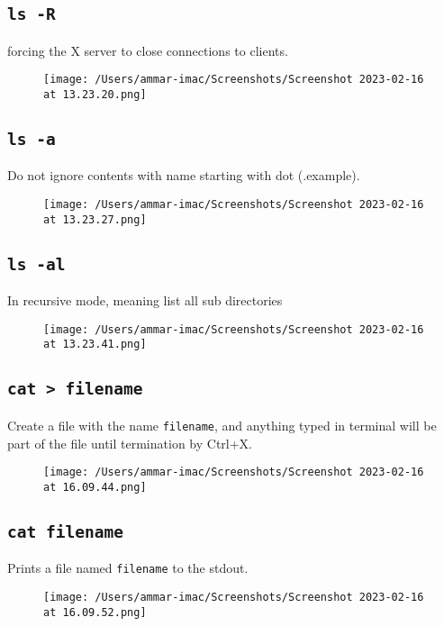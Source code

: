 \documentclass{article}
\def\code#1{\texttt{#1}}
\begin{document}
\newpage


\subsection{\code{ls -R}}%
forcing the X server to close connections to clients.
\begin{figure}[ht]
  \centering
  \texttt{[image: /Users/ammar-imac/Screenshots/Screenshot 2023-02-16 at 13.23.20.png]}
\end{figure}

\subsection{\code{ls -a}}%
Do not ignore contents with name starting with dot (.example).
\begin{figure}[ht]
  \centering
  \texttt{[image: /Users/ammar-imac/Screenshots/Screenshot 2023-02-16 at 13.23.27.png]}
\end{figure}

\subsection{\code{ls -al}}%
In recursive mode, meaning list all sub directories
\begin{figure}[ht]
  \centering
  \texttt{[image: /Users/ammar-imac/Screenshots/Screenshot 2023-02-16 at 13.23.41.png]}
\end{figure}


\newpage


\subsection{\code{cat > filename}}%
Create a file with the name \code{filename}, and anything typed in terminal will be part of the file
until termination by Ctrl+X.
\begin{figure}[ht]
  \centering
  \texttt{[image: /Users/ammar-imac/Screenshots/Screenshot 2023-02-16 at 16.09.44.png]}
\end{figure}

\subsection{\code{cat filename}}%
Prints a file named \code{filename} to the stdout.
\begin{figure}[ht]
  \centering
  \texttt{[image: /Users/ammar-imac/Screenshots/Screenshot 2023-02-16 at 16.09.52.png]}
\end{figure}
\end{document}
